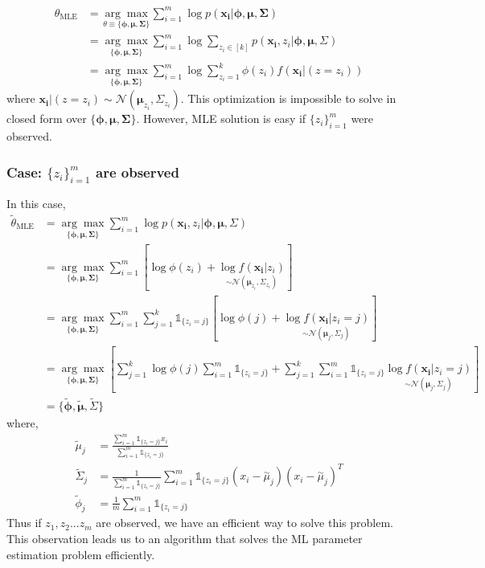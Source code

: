 \documentclass[a4paper,english,12pt]{article}
\begin{document}
\begin{align}
\theta_{\text{MLE}}&=\underset{\theta\equiv\{\pmb{\phi},\boldsymbol{\mu},\boldsymbol{\Sigma}\}}{\arg\max}\sum_{i=1}^{m}\log{p\left(\boldsymbol{x_i}|\pmb{\phi},\boldsymbol{\mu},\boldsymbol{\Sigma}\right)}\\
&=\underset{\{\pmb{\phi},\boldsymbol{\mu},\boldsymbol{\Sigma}\}}{\arg\max}\sum_{i=1}^{m}\log{\sum_{z_i\in[k]}p\left(\boldsymbol{x_i},z_i|\pmb{\phi},\boldsymbol{\mu},\Sigma\right)}\\
&=\underset{\{\pmb{\phi},\boldsymbol{\mu},\boldsymbol{\Sigma}\}}{\arg\max} \sum_{i=1}^{m}\log{\sum_{z_i=1}^{k}\phi(z_i)f(\boldsymbol{x_i}|(z=z_i))}
\end{align}
where $\boldsymbol{x_i}|(z=z_i)\sim\mathcal{N}\left(\boldsymbol{\mu}_{z_i},\Sigma_{z_i}\right)$. This optimization is impossible to solve in closed form over $\{\pmb{\phi},\boldsymbol{\mu},\boldsymbol{\Sigma}\}$. However, MLE solution is easy if $\{ z_i \}_{i=1}^{m}$ were observed. 
\subsubsection*{Case: $\{ z_i \}_{i=1}^{m}$ are observed}
In this case,
\begin{align}
\tilde{\theta}_{\text{MLE}}&=\underset{\{\pmb{\phi},\boldsymbol{\mu},\boldsymbol{\Sigma}\}}{\arg\max}\sum_{i=1}^{m}\log{p\left(\boldsymbol{x_i},z_i|\pmb{\phi},\boldsymbol{\mu},\Sigma\right)}\\
&=\underset{\{\pmb{\phi},\boldsymbol{\mu},\boldsymbol{\Sigma}\}}{\arg\max} \sum_{i=1}^{m}\left[\log{\phi(z_i)}+\underset{\sim\mathcal{N}\left(\boldsymbol{\mu}_{z_i},\Sigma_{z_i}\right)}{\log{f(\boldsymbol{x_i}|z_i)}}\right]\\
&=\underset{\{\pmb{\phi},\boldsymbol{\mu},\boldsymbol{\Sigma}\}}{\arg\max} \sum_{i=1}^{m}\sum_{j=1}^{k}\mathds{1}_{\{z_i=j\}}\left[\log{\phi(j)}+\underset{\sim\mathcal{N}\left(\boldsymbol{\mu}_{j},\Sigma_{j}\right)}{\log{f(\boldsymbol{x_i}|z_i=j)}}\right]\\
&=\underset{\{\pmb{\phi},\boldsymbol{\mu},\boldsymbol{\Sigma}\}}{\arg\max} \left[\sum_{j=1}^{k}\log{\phi(j)}\sum_{i=1}^{m}\mathds{1}_{\{z_i=j\}}+\sum_{j=1}^{k}\sum_{i=1}^{m}\mathds{1}_{\{z_i=j\}}\underset{\sim\mathcal{N}\left(\boldsymbol{\mu}_{j},\Sigma_{j}\right)}{\log{f(\boldsymbol{x_i}|z_i=j)}}\right]\\
&=\{\tilde{\pmb{\phi}},\tilde{\boldsymbol{\mu}},\tilde{\Sigma }\}
\end{align}
where,
\begin{align}
\tilde{\mu}_j&=\frac{\sum_{i=1}^{m}\mathds{1}_{\{z_i=j\}}x_i}{\sum_{i=1}^{m}\mathds{1}_{\{z_i=j\}}}\\
\tilde{\Sigma}_j&=\frac{1}{\sum_{i=1}^{m}\mathds{1}_{\{z_i=j\}}}\sum_{i=1}^{m}\mathds{1}_{\{z_i=j\}}\left(x_i-\overset{\sim}{\mu}_j\right)\left(x_i-\overset{\sim}{\mu}_j\right)^T\\
\tilde{\phi}_j&=\frac{1}{m}\sum_{i=1}^{m}\mathds{1}_{\{z_i=j\}}
\end{align}
Thus if $z_1, z_2...z_m$ are observed, we have an efficient way to solve this problem. This observation leads us to an algorithm that solves the ML parameter estimation problem efficiently.
\end{document}
